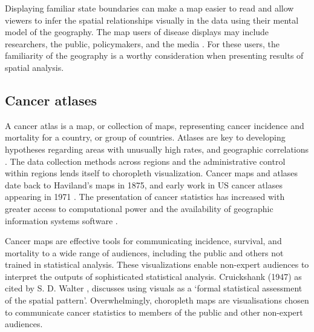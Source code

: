 \documentclass{monashthesis}
\begin{document}
Displaying familiar state boundaries can make a map easier to read \autocite{CIBMUK} and allow viewers to infer the spatial relationships visually in the data using their mental model of the geography. The map users of disease displays may include researchers, the public, policymakers, and the media \autocite{CPISACA}. For these users, the familiarity of the geography is a worthy consideration when presenting results of spatial analysis.

\hypertarget{ch:public}{%
\subsection{Cancer atlases}\label{ch:public}}

A cancer atlas is a map, or collection of maps, representing cancer incidence and mortality for a country, or group of countries. Atlases are key to developing hypotheses regarding areas with unusually high rates, and geographic correlations \autocite{MACM}. The data collection methods across regions and the administrative control within regions lends itself to choropleth visualization. Cancer maps and atlases date back to Haviland's maps in 1875, and early work in US cancer atlases appearing in 1971 \autocite{burbank}. The presentation of cancer statistics has increased with greater access to computational power and the availability of geographic information systems software \autocite{SE}.

Cancer maps are effective tools for communicating incidence, survival, and mortality to a wide range of audiences, including the public and others not trained in statistical analysis. These visualizations enable non-expert audiences to interpret the outputs of sophisticated statistical analysis. Cruickshank (1947) as cited by S. D. Walter \autocite{DMAHP}, discusses using visuals as a `formal statistical assessment of the spatial pattern'. Overwhelmingly, choropleth maps are visualisations chosen to communicate cancer statistics to members of the public and other non-expert audiences.

\begin{Shaded}
\begin{Highlighting}[]
\OperatorTok{::}\NormalTok{(}\NormalTok{)}
\end{Highlighting}
\end{Shaded}
\end{document}
